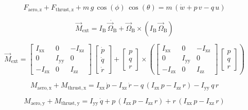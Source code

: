\documentclass[lettersize,journal]{IEEEtran}
\begin{document}
{\begin{equation}
F_{\mathrm{aero,z}}+F_{\mathrm{thrust,z}}+m\,g\,\cos\left(\phi \right)\,\cos\left(\theta \right)=m\,\left(\dot{w}+p\,v-q\,u\right)
\end{equation}

\begin{equation}
\overrightarrow{M}_{\mathrm{ext}}=I_{\mathrm{B}}\,\dot{\overrightarrow{\Omega}_{\mathrm{B}}} + \overrightarrow{\Omega}_{\mathrm{B}} \times \left(I_{\mathrm{B}}\,\overrightarrow{\Omega}_{\mathrm{B}}\right)
\end{equation}

\begin{equation}
\overrightarrow{M}_{\mathrm{ext}}=\left[\begin{array}{ccc} I_{\mathrm{xx}} & 0 & -I_{\mathrm{xz}}\\ 0 & I_{\mathrm{yy}} & 0\\ -I_{\mathrm{zx}} & 0 & I_{\mathrm{zz}} \end{array}\right]\,\left[\begin{array}{c} \dot{p}\\ \dot{q}\\ \dot{r} \end{array}\right]+\left[\begin{array}{c} p\\ q\\ r \end{array}\right] \times \left(\left[\begin{array}{ccc} I_{\mathrm{xx}} & 0 & -I_{\mathrm{xz}}\\ 0 & I_{\mathrm{yy}} & 0\\ -I_{\mathrm{zx}} & 0 & I_{\mathrm{zz}} \end{array}\right]\,\left[\begin{array}{c} p\\ q\\ r \end{array}\right]\right)
\end{equation}

\begin{equation}
M_{\mathrm{aero,x}}+M_{\mathrm{thrust,x}}=I_{\mathrm{xx}}\,\dot{p}-I_{\mathrm{xz}}\,\dot{r}-q\,\left(I_{\mathrm{zx}}\,p-I_{\mathrm{zz}}\,r\right)-I_{\mathrm{yy}}\,q\,r
\end{equation}

\begin{equation}
M_{\mathrm{aero,y}}+M_{\mathrm{thrust,y}}=I_{\mathrm{yy}}\,\dot{q}+p\,\left(I_{\mathrm{zx}}\,p-I_{\mathrm{zz}}\,r\right)+r\,\left(I_{\mathrm{xx}}\,p-I_{\mathrm{xz}}\,r\right)
\end{equation}

}
\end{document}
